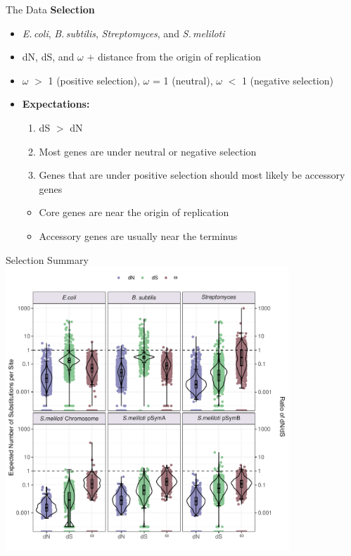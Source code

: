 \documentclass{beamer}
\makeatletter
\newcommand{\bi}{\begin{itemize}}
\newcommand{\ei}{\end{itemize}}
\newcommand{\itm}{\item<itm@1->}
\newcommand{\smel}{\textit{S.\,meliloti}\xspace}
\newcommand{\bass}{\textit{B.\,subtilis}\xspace}
\newcommand{\strep}{\textit{Streptomyces}\xspace}
\newcommand{\ecol}{\textit{E.\,coli}\xspace}
\makeatother
\begin{document}
\begin{frame}[t]{The Data}
			\textbf{Selection}
			\bi
			\itm \ecol, \bass, \strep, and \smel
			\itm dN, dS, and $\omega$ $+$ distance from the origin of replication
			\itm $\omega$ $>$ 1 (positive selection), $\omega$ = 1 (neutral), $\omega$ $<$ 1 (negative selection)
			\itm \textbf{Expectations:} 
			\begin{enumerate}
				\item dS $>$ dN
				\item Most genes are under neutral or negative selection
				\item Genes that are under positive selection should most likely be accessory genes
			\end{enumerate}
			\bi
			\itm Core genes are near the origin of replication
			\itm Accessory genes are usually near the terminus
			\ei
			\ei
\end{frame}
\begin{frame}{Selection Summary}
	\centering
	\includegraphics[width=0.8\textwidth]{selection_vio_box.pdf}
\end{frame}
\end{document}
